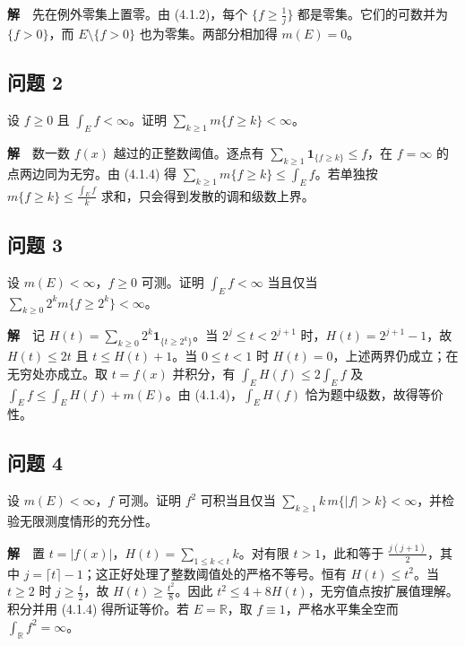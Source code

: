 \documentclass[11pt,a4paper]{article}
\begin{document}
\textbf{解}　先在例外零集上置零。由 (4.1.2)，每个 \(\{f\ge\frac1j\}\)
都是零集。它们的可数并为 \(\{f>0\}\)，而 \(E\setminus\{f>0\}\)
也为零集。两部分相加得 \(m(E)=0\)。

\subsection{问题 2}\label{ux95eeux9898-2}

设 \(f\ge0\) 且 \(\int_E f<\infty\)。证明
\(\sum_{k\ge1}m\{f\ge k\}<\infty\)。

\textbf{解}　数一数 \(f(x)\) 越过的正整数阈值。逐点有
\(\sum_{k\ge1}\mathbf1_{\{f\ge k\}}\le f\)，在 \(f=\infty\)
的点两边同为无穷。由 (4.1.4) 得
\(\sum_{k\ge1}m\{f\ge k\}\le\int_E f\)。若单独按
\(m\{f\ge k\}\le\frac{\int_E f}{k}\) 求和，只会得到发散的调和级数上界。

\subsection{问题 3}\label{ux95eeux9898-3}

设 \(m(E)<\infty\)，\(f\ge0\) 可测。证明 \(\int_E f<\infty\) 当且仅当
\(\sum_{k\ge0}2^k m\{f\ge2^k\}<\infty\)。

\textbf{解}　记 \(H(t)=\sum_{k\ge0}2^k\mathbf1_{\{t\ge2^k\}}\)。当
\(2^j\le t<2^{j+1}\) 时，\(H(t)=2^{j+1}-1\)，故 \(H(t)\le2t\) 且
\(t\le H(t)+1\)。当 \(0\le t<1\) 时
\(H(t)=0\)，上述两界仍成立；在无穷处亦成立。取 \(t=f(x)\) 并积分，有
\(\int_E H(f)\le2\int_E f\) 及 \(\int_E f\le\int_E H(f)+m(E)\)。由
(4.1.4)，\(\int_E H(f)\) 恰为题中级数，故得等价性。

\subsection{问题 4}\label{ux95eeux9898-4}

设 \(m(E)<\infty\)，\(f\) 可测。证明 \(f^2\) 可积当且仅当
\(\sum_{k\ge1}k\,m\{|f|>k\}<\infty\)，并检验无限测度情形的充分性。

\textbf{解}　置 \(t=|f(x)|\)，\(H(t)=\sum_{1\le k<t}k\)。对有限
\(t>1\)，此和等于 \(\frac{j(j+1)}2\)，其中
\(j=\lceil t\rceil-1\)；这正好处理了整数阈值处的严格不等号。恒有
\(H(t)\le t^2\)。当 \(t\ge2\) 时 \(j\ge \frac t2\)，故
\(H(t)\ge \frac{t^2}{8}\)。因此
\(t^2\le4+8H(t)\)，无穷值点按扩展值理解。积分并用 (4.1.4) 得所证等价。若
\(E=\mathbb R\)，取 \(f\equiv1\)，严格水平集全空而
\(\int_{\mathbb R}f^2=\infty\)。
\end{document}

